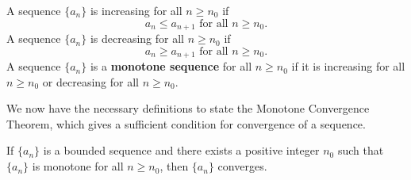 \documentclass{report}
\begin{document}
    \bigbreak \noindent 
    \begin{definition}[]
        A sequence \( \{a_n\} \) is increasing for all \( n \geq n_0 \) if
        \[ a_n \leq a_{n+1} \text{ for all } n \geq n_0. \]
        \bigbreak \noindent 
        A sequence \( \{a_n\} \) is decreasing for all \( n \geq n_0 \) if
        \[ a_n \geq a_{n+1} \text{ for all } n \geq n_0. \]
        A sequence \( \{a_n\} \) is a \textbf{monotone sequence} for all \( n \geq n_0 \) if it is increasing for all \( n \geq n_0 \) or decreasing for all \( n \geq n_0 \).
    \end{definition}

    \bigbreak \noindent \bigbreak \noindent 
    We now have the necessary definitions to state the Monotone Convergence Theorem, which gives a sufficient condition for convergence of a sequence.
    \begin{thrm}
        If \( \{a_n\} \) is a bounded sequence and there exists a positive integer \( n_0 \) such that \( \{a_n\} \) is monotone for all \( n \geq n_0 \), then \( \{a_n\} \) converges.
    \end{thrm}
\end{document}
